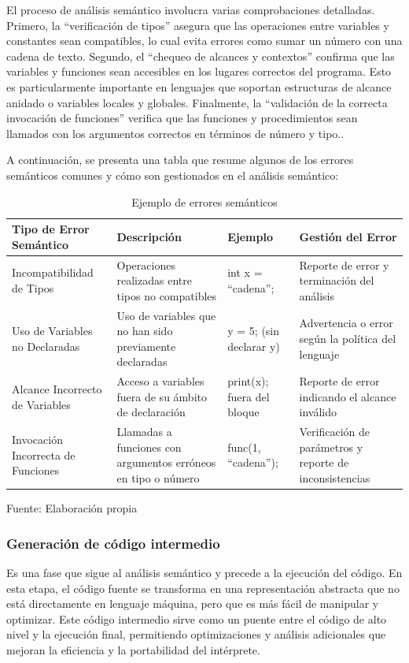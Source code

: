 El proceso de análisis semántico involucra varias comprobaciones detalladas. Primero, la “verificación de tipos” asegura que las operaciones entre variables y constantes sean compatibles, lo cual evita errores como sumar un número con una cadena de texto. Segundo, el “chequeo de alcances y contextos” confirma que las variables y funciones sean accesibles en los lugares correctos del programa. Esto es particularmente importante en lenguajes que soportan estructuras de alcance anidado o variables locales y globales. Finalmente, la “validación de la correcta invocación de funciones” verifica que las funciones y procedimientos sean llamados con los argumentos correctos en términos de número y tipo.. \parencite{Jeffery2021}

A continuación, se presenta una tabla que resume algunos de los errores semánticos comunes y cómo son gestionados en el análisis semántico:
\begin{table}[!h]
  \begin{center}
    \begin{tabularx}{0.85\textwidth}{|X|X|X|X|}
      \hline
      \textbf{Tipo de Error Semántico} & \textbf{Descripción} & \textbf{Ejemplo} & \textbf{Gestión del Error} \\
      \hline
      Incompatibilidad de Tipos & Operaciones realizadas entre tipos no compatibles & int x = ``cadena''; & Reporte de error y terminación del análisis \\
      \hline
      Uso de Variables no Declaradas & Uso de variables que no han sido previamente declaradas & y = 5; (sin declarar y) & Advertencia o error según la política del lenguaje \\
      \hline
      Alcance Incorrecto de Variables & Acceso a variables fuera de su ámbito de declaración & print(x); fuera del bloque & Reporte de error indicando el alcance inválido \\
      \hline
      Invocación Incorrecta de Funciones & Llamadas a funciones con argumentos erróneos en tipo o número & func(1, ``cadena''); & Verificación de parámetros y reporte de inconsistencias \\
      \hline
    \end{tabularx}
  \end{center}
  \caption{Ejemplo de errores semánticos}
  \centering Fuente: Elaboración propia
  \label{tab:errores_semanticos}
\end{table}

\newpage
\subsubsection{Generación de código intermedio}
Es una fase que sigue al análisis semántico y precede a la ejecución del código. En esta etapa, el código fuente se transforma en una representación abstracta que no está directamente en lenguaje máquina, pero que es más fácil de manipular y optimizar. Este código intermedio sirve como un puente entre el código de alto nivel y la ejecución final, permitiendo optimizaciones y análisis adicionales que mejoran la eficiencia y la portabilidad del intérprete.

